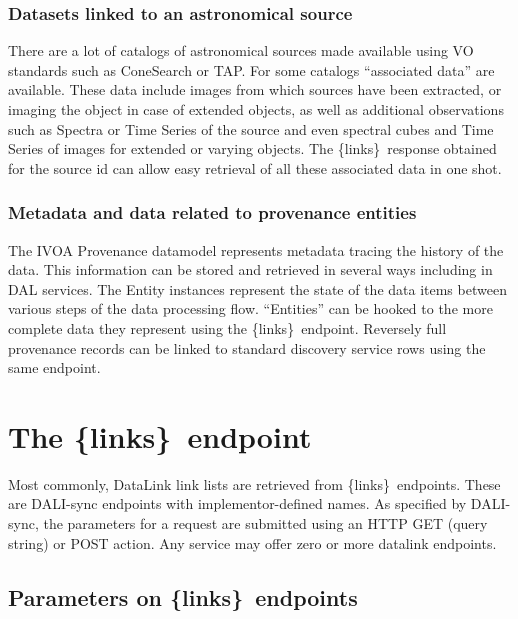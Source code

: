 \documentclass[11pt,a4paper]{ivoa}
\newcommand{\blinks}{\{links\}}
\begin{document}
\subsubsection{Datasets linked to an astronomical source}
\label{sec:useSource}

There are  a lot of catalogs of astronomical sources made available
using VO standards such as ConeSearch \citep{2008ivoa.specQ0222P} or
TAP.  For some catalogs ``associated data'' are available. These
data include images from which sources have been extracted, or imaging the
object in  case of extended objects, as well as additional observations
such as Spectra or Time Series of the source and even spectral cubes
and Time Series of images for extended or varying objects. The \blinks\
response obtained for the source id can allow easy retrieval of all
these associated data in one shot.

\subsubsection{Metadata and data related to provenance entities}
\label{sec:useProvenance}

The IVOA Provenance datamodel \citep{pr:provdm} represents metadata
tracing  the history of the data. This information can be stored and retrieved
in several ways including  in DAL services.
The Entity instances represent  the state of the data items between
various steps of the data processing flow. ``Entities'' can be hooked
to the more complete data they represent using the \blinks\ endpoint.
Reversely full provenance records can be linked to standard discovery service rows using the same endpoint.

\section{The \blinks\ endpoint}

\label{sec:linksEndpoint}

Most commonly, DataLink link lists are retrieved from \blinks\ endpoints.
These are DALI-sync endpoints with implementor-defined names.
As specified by DALI-sync, the parameters for a request are submitted
using an HTTP GET (query string) or POST action.  Any service may offer
zero or more datalink endpoints.

\subsection{Parameters on \blinks\ endpoints}
\end{document}
